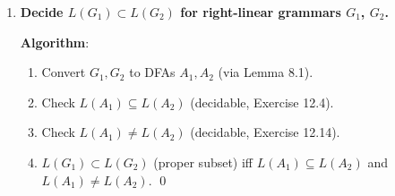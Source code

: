 \begin{enumerate}[{12.}1. ]
\begin{enumerate}
\item \textbf{At least one equivalence class is finite}: Minimize $A$ to obtain
the connected DFA
\[
M=\langle \Sigma,S,s_0,\delta,F\rangle.
\]
Its states correspond to the classes of $R_{L(A)}$. For a state $q\in S$, the
corresponding class is
\[
I(M,q)=\{x\in\Sigma^*\mid \DBAR(s_0,x)=q\}.
\]
This set is infinite iff some directed cycle reachable from $s_0$ can also
reach $q$: traversing such a cycle any number of times gives infinitely many
different strings in $I(M,q)$. Conversely, if no reachable cycle can reach
$q$, then only finitely many paths lead from $s_0$ to $q$, so $I(M,q)$ is
finite.

Therefore at least one class is finite iff there is some state $q$ not
reachable from any reachable cycle. This is decidable by graph search.

\item \textbf{All equivalence classes are finite}: No. By Definition~1.1,
$\Sigma$ is nonempty, so $\Sigma^*$ is infinite. The relation $R_{L(A)}$ has
only finitely many equivalence classes because $L(A)$ is FAD (equivalently,
the reduced connected DFA is isomorphic to $A_{R_{L(A)}}$ by
Theorem~3.1). If all of those finitely many classes were finite, then
their union $\Sigma^*$ would be finite, a contradiction. Thus the one-step
decision procedure always answers No. \qed
\end{enumerate}

\item \textbf{Decide $L(G_1)\subset L(G_2)$ for right-linear grammars $G_1$, $G_2$.}

\textbf{Algorithm}:
\begin{enumerate}
\item Convert $G_1, G_2$ to DFAs $A_1, A_2$ (via Lemma 8.1).
\item Check $L(A_1)\subseteq L(A_2)$ (decidable, Exercise 12.4).
\item Check $L(A_1)\neq L(A_2)$ (decidable, Exercise 12.14).
\item $L(G_1)\subset L(G_2)$ (proper subset) iff $L(A_1)\subseteq L(A_2)$ and $L(A_1)\neq L(A_2)$. \qed
\end{enumerate}

\end{enumerate}
